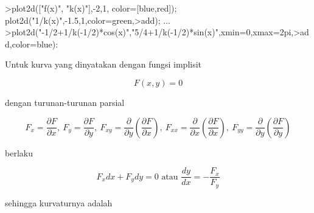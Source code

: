 \documentclass[a4paper,10pt]{article}
\begin{document}
\begin{eulernotebook}
\begin{eulercomment}
\begin{eulercomment}
\begin{eulercomment}
\begin{eulercomment}
\begin{eulercomment}
\begin{eulercomment}
\begin{eulercomment}
\begin{eulercomment}
\begin{eulercomment}
\begin{eulercomment}
\begin{eulercomment}
\begin{eulercomment}
\begin{eulercomment}
\begin{eulercomment}
\begin{eulercomment}
\begin{eulercomment}
\begin{eulercomment}
\begin{eulercomment}
\begin{eulercomment}
\begin{eulercomment}
\begin{eulercomment}
\begin{eulercomment}
\begin{eulercomment}
\end{eulercomment}
\begin{eulerprompt}
>plot2d(["f(x)", "k(x)"],-2,1, color=[blue,red]); plot2d("1/k(x)",-1.5,1,color=green,>add); ...
>plot2d("-1/2+1/k(-1/2)*cos(x)","5/4+1/k(-1/2)*sin(x)",xmin=0,xmax=2pi,>add,color=blue):
\end{eulerprompt}
\begin{eulercomment}
Untuk kurva yang dinyatakan dengan fungsi implisit

\end{eulercomment}
\begin{eulerformula}
\[
F(x,y)=0
\]
\end{eulerformula}
\begin{eulercomment}
dengan turunan-turunan parsial

\end{eulercomment}
\begin{eulerformula}
\[
F_x=\frac{\partial F}{\partial x},\ F_y=\frac{\partial F}{\partial y},\ F_{xy}=\frac{\partial}{\partial y}\left(\frac{\partial F}{\partial x}\right),\ F_{xx}=\frac{\partial}{\partial x}\left(\frac{\partial F}{\partial x}\right),\ F_{yy}=\frac{\partial}{\partial y}\left(\frac{\partial F}{\partial y}\right)
\]
\end{eulerformula}
\begin{eulercomment}
berlaku

\end{eulercomment}
\begin{eulerformula}
\[
F_x dx+ F_y dy = 0\text{ atau } \frac{dy}{dx}=-\frac{F_x}{F_y}
\]
\end{eulerformula}
\begin{eulercomment}
sehingga kurvaturnya adalah


\end{eulercomment}
\end{eulercomment}
\end{eulercomment}
\end{eulercomment}
\end{eulercomment}
\end{eulercomment}
\end{eulercomment}
\end{eulercomment}
\end{eulercomment}
\end{eulercomment}
\end{eulercomment}
\end{eulercomment}
\end{eulercomment}
\end{eulercomment}
\end{eulercomment}
\end{eulercomment}
\end{eulercomment}
\end{eulercomment}
\end{eulercomment}
\end{eulercomment}
\end{eulercomment}
\end{eulercomment}
\end{eulercomment}
\end{eulernotebook}
\end{document}
